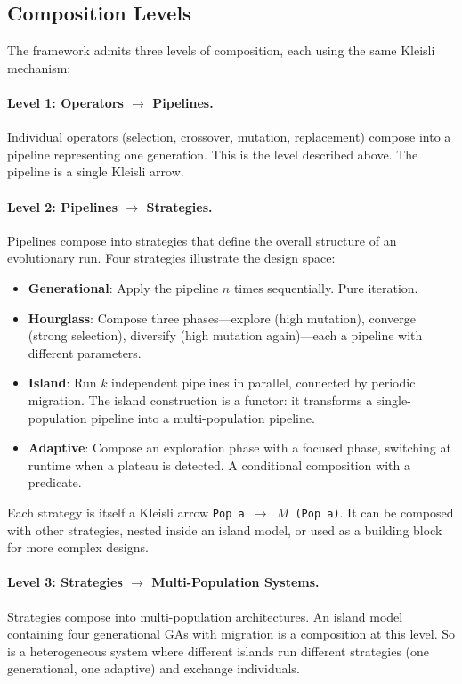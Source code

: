 \documentclass[dvipsnames,format=sigconf,anonymous=true,review=false]{acmart}
\begin{document}
\subsection{Composition Levels}

The framework admits three levels of composition, each using the same Kleisli mechanism:

\paragraph{Level 1: Operators $\to$ Pipelines.}
Individual operators (selection, crossover, mutation, replacement) compose into a pipeline representing one generation. This is the level described above. The pipeline is a single Kleisli arrow.

\paragraph{Level 2: Pipelines $\to$ Strategies.}
Pipelines compose into strategies that define the overall structure of an evolutionary run. Four strategies illustrate the design space:

\begin{itemize}[nosep]
  \item \textbf{Generational}: Apply the pipeline $n$ times sequentially. Pure iteration.
  \item \textbf{Hourglass}: Compose three phases---explore (high mutation), converge (strong selection), diversify (high mutation again)---each a pipeline with different parameters.
  \item \textbf{Island}: Run $k$ independent pipelines in parallel, connected by periodic migration. The island construction is a functor: it transforms a single-population pipeline into a multi-population pipeline.
  \item \textbf{Adaptive}: Compose an exploration phase with a focused phase, switching at runtime when a plateau is detected. A conditional composition with a predicate.
\end{itemize}

\noindent Each strategy is itself a Kleisli arrow \texttt{Pop\,a $\to$ $M$\,(Pop\,a)}. It can be composed with other strategies, nested inside an island model, or used as a building block for more complex designs.

\paragraph{Level 3: Strategies $\to$ Multi-Population Systems.}
Strategies compose into multi-population architectures. An island model containing four generational GAs with migration is a composition at this level. So is a heterogeneous system where different islands run different strategies (one generational, one adaptive) and exchange individuals.
\end{document}

